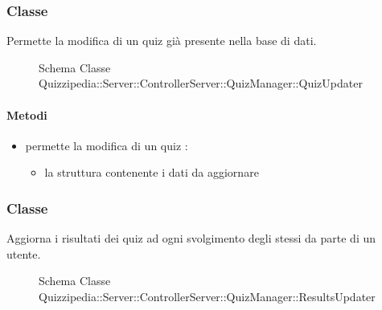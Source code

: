 \subsubsection{Classe }
Permette la modifica di un quiz già presente nella base di dati.
\begin{figure}[H]
\centering
\noindent{}
\caption[Schema Classe QuizUpdater]{Schema Classe Quizzipedia::Server::ControllerServer::QuizManager::QuizUpdater}
\end{figure}
\paragraph{Metodi}
\begin{itemize}
\item {}
\newline
permette la modifica di un quiz
\newline
{} :
\begin{itemize}
\item {}
\newline
la struttura contenente i dati da aggiornare
\end{itemize}
\end{itemize}
\subsubsection{Classe }
Aggiorna i risultati dei quiz ad ogni svolgimento degli stessi da parte di un utente.
\begin{figure}[H]
\centering
\noindent{}
\caption[Schema Classe ResultsUpdater]{Schema Classe Quizzipedia::Server::ControllerServer::QuizManager::ResultsUpdater}
\end{figure}
